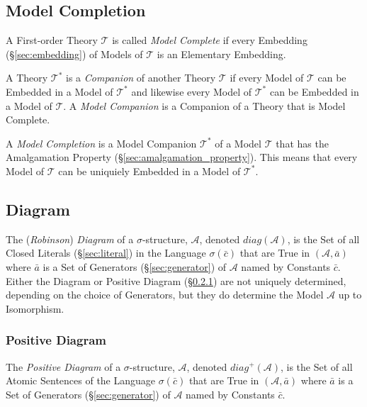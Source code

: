 \subsection{Model Completion}\label{sec:model_completion}

A First-order Theory $\mathcal{T}$ is called \emph{Model Complete} if
every Embedding (\S\ref{sec:embedding}) of Models of $\mathcal{T}$ is
an Elementary Embedding.

A Theory $\mathcal{T}^*$ is a \emph{Companion} of another Theory
$\mathcal{T}$ if every Model of $\mathcal{T}$ can be Embedded in a
Model of $\mathcal{T}^*$ and likewise every Model of $\mathcal{T}^*$
can be Embedded in a Model of $\mathcal{T}$. A \emph{Model Companion}
is a Companion of a Theory that is Model Complete.

A \emph{Model Completion} is a Model Companion $\mathcal{T}^*$ of a
Model $\mathcal{T}$ that has the Amalgamation Property
(\S\ref{sec:amalgamation_property}). This means that every Model of
$\mathcal{T}$ can be uniquiely Embedded in a Model of $\mathcal{T}^*$.



\subsection{Diagram}\label{sec:diagram}

The (\emph{Robinson}) \emph{Diagram} of a $\sigma$-structure,
$\mathcal{A}$, denoted $diag(\mathcal{A})$, is the Set of all Closed
Literals (\S\ref{sec:literal}) in the Language $\sigma(\bar{c})$ that
are True in $(\mathcal{A}, \bar{a})$ where $\bar{a}$ is a Set of
Generators (\S\ref{sec:generator}) of $\mathcal{A}$ named by Constants
$\bar{c}$. Either the Diagram or Positive Diagram
(\S\ref{sec:positive_diagram}) are not uniquely determined, depending
on the choice of Generators, but they do determine the Model
$\mathcal{A}$ up to Isomorphism.



\subsubsection{Positive Diagram}\label{sec:positive_diagram}

The \emph{Positive Diagram} of a $\sigma$-structure, $\mathcal{A}$,
denoted $diag^+(\mathcal{A})$, is the Set of all Atomic Sentences of
the Language $\sigma(\bar{c})$ that are True in $(\mathcal{A},
\bar{a})$ where $\bar{a}$ is a Set of Generators
(\S\ref{sec:generator}) of $\mathcal{A}$ named by Constants $\bar{c}$.




